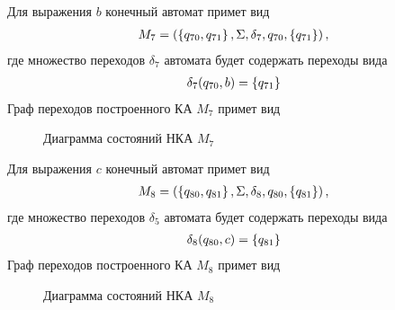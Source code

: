 Для выражения \(b\) конечный автомат примет вид
\begin{align*}
	M_7 = \left(\left\{q_{70}, q_{71}\right\}, \Sigma, \delta_7, q_{70}, \left\{q_{71}\right\}\right),
\end{align*}
где множество переходов \(\delta_7\) автомата будет содержать переходы вида
\begin{align*}
	\delta_7(q_{70}, b) = \left\{q_{71}\right\}
\end{align*}
Граф переходов построенного КА \(M_7\) примет вид
\begin{figure}[h!]
	\centering
	\caption{Диаграмма состояний НКА \(M_7\)}
\end{figure}


Для выражения \(c\) конечный автомат примет вид
\begin{align*}
	M_8 = \left(\left\{q_{80}, q_{81}\right\}, \Sigma, \delta_8, q_{80}, \left\{q_{81}\right\}\right),
\end{align*}
где множество переходов \(\delta_5\) автомата будет содержать переходы вида
\begin{align*}
	\delta_8(q_{80}, c) = \left\{q_{81}\right\}
\end{align*}
Граф переходов построенного КА \(M_8\) примет вид
\begin{figure}[h!]
	\centering
	\caption{Диаграмма состояний НКА \(M_8\)}
\end{figure}
